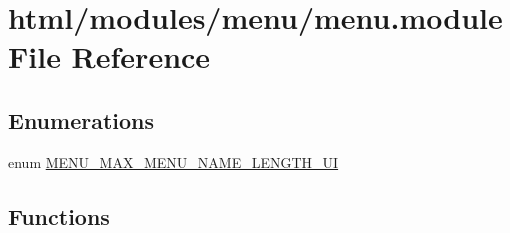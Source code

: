 \hypertarget{menu_8module}{
\section{html/modules/menu/menu.module File Reference}
\label{menu_8module}
}
\subsection*{Enumerations}
\begin{DoxyCompactItemize}
\item 
enum \hyperlink{menu_8module_a3f5ac95d690e01db43fce5260fab1705}{MENU\_\-MAX\_\-MENU\_\-NAME\_\-LENGTH\_\-UI} 
\end{DoxyCompactItemize}
\subsection*{Functions}
